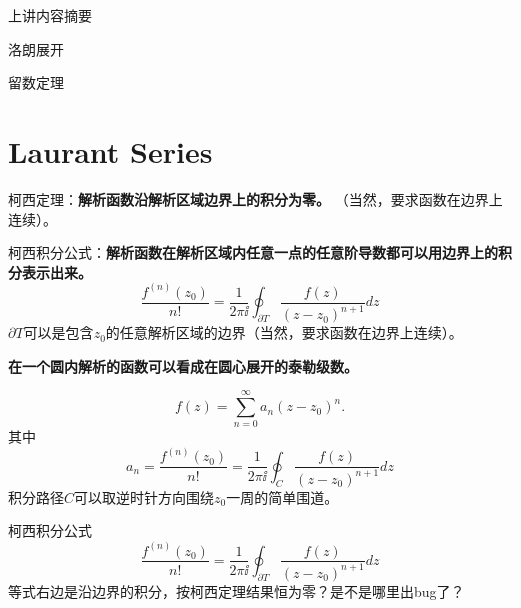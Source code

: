 \documentclass[CJK]{beamer}
\date{}
\begin{document}


\begin{frame}
\bch
\bitem
\item{上讲内容摘要}
\item{洛朗展开}
\item{留数定理}
\eitem
\ech
\end{frame}


\section{Laurant Series}

\begin{frame}
  \bch
  柯西定理：{\bf \blue 解析函数沿解析区域边界上的积分为零。}
  （当然，要求函数在边界上连续）。
  \ech
\end{frame}


\begin{frame}
  \bch
  柯西积分公式：{\bf \blue 解析函数在解析区域内任意一点的任意阶导数都可以用边界上的积分表示出来。}
  $$\frac{f^{(n)}(z_0)}{n!} =  \frac{1}{2\pi \ii}\oint_{\partial T} \frac{f(z)}{(z-z_0)^{n+1}}dz$$
  $\partial T$可以是包含$z_0$的任意解析区域的边界（当然，要求函数在边界上连续）。
  \ech
\end{frame}

\begin{frame}
  \bch
  {\bf \blue 在一个圆内解析的函数可以看成在圆心展开的泰勒级数。}

  $$f(z) = \sum_{n=0}^{\infty} a_n (z-z_0)^n.$$
  其中
  $$a_n = \frac{f^{(n)}(z_0)}{n!} =  \frac{1}{2\pi \ii}\oint_C \frac{f(z)}{(z-z_0)^{n+1}}dz$$
  积分路径$C$可以取逆时针方向围绕$z_0$一周的简单围道。
  \ech
\end{frame}


\begin{frame}
  \bch
  
  柯西积分公式
    $$\frac{f^{(n)}(z_0)}{n!} =  \frac{1}{2\pi \ii}\oint_{\partial T} \frac{f(z)}{(z-z_0)^{n+1}}dz$$
  等式右边是沿边界的积分，按柯西定理结果恒为零？是不是哪里出bug了？
  \ech
\end{frame}
\end{document}
